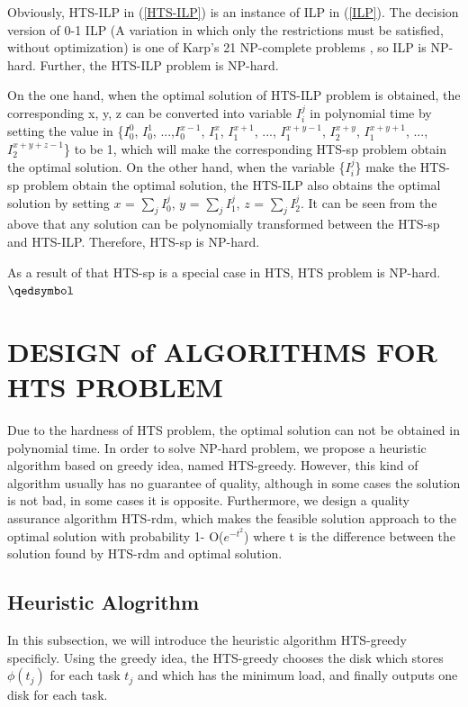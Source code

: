 \documentclass[conference]{IEEEtran}
\begin{document}
Obviously, HTS-ILP in (\ref{HTS-ILP}) is an instance of ILP in (\ref{ILP}). The decision version of 0-1 ILP (A variation in which only the restrictions must be satisfied, without optimization) is one of Karp's 21 NP-complete problems  \cite{b9}, so ILP is NP-hard. Further, the HTS-ILP problem is NP-hard.

On the one hand, when the optimal solution of HTS-ILP problem is obtained, the corresponding {x, y, z} can be converted into variable {$I_i^j$} in polynomial time by setting the value in \{$I_0^0$, $I_0^1$, ...,$I_0^{x-1}$, $I_1^{x}$, $I_1^{x+1}$, ..., $I_1^{x+y-1}$, $I_2^{x+y}$, $I_1^{x+y+1}$, ..., $I_2^{x+y+z-1}$\} to be 1, which will make the corresponding HTS-sp problem obtain the optimal solution. On the other hand, when the variable \{$I_i^j$\} make the HTS-sp problem obtain the optimal solution, the HTS-ILP also obtains the optimal solution by setting $x$ = $\sum_{j}I_0^j$, $y$ = $\sum_{j}I_1^j$, $z$ = $\sum_{j}I_2^j$. It can be seen from the above that any solution can be polynomially transformed between the HTS-sp and HTS-ILP. Therefore, HTS-sp is NP-hard. 

As a result of that HTS-sp is a special case in HTS, HTS problem is NP-hard.\hfill $\qedsymbol$

\section{DESIGN of ALGORITHMS FOR HTS PROBLEM}\label{DESIGN_ALGORITHM}

Due to the hardness of HTS problem, the optimal solution can not be obtained in polynomial time. In order to solve NP-hard problem, we propose a heuristic algorithm based on greedy idea, named HTS-greedy. However, this kind of algorithm usually has no guarantee of quality, although in some cases the solution is not bad, in some cases it is opposite. Furthermore, we design a quality assurance algorithm HTS-rdm, which makes the feasible solution approach to the optimal solution with probability 1- O($e^{-t^2}$) where t is the difference between the solution found by HTS-rdm and optimal solution.


\subsection{Heuristic Alogrithm}\label{Heuristic}

In this subsection, we will introduce the heuristic algorithm HTS-greedy specificly. Using the greedy idea, the HTS-greedy chooses the disk which stores $\phi(t_j)$ for each task $t_j$ and which has the minimum load, and finally outputs one disk for each task.
\end{document}
